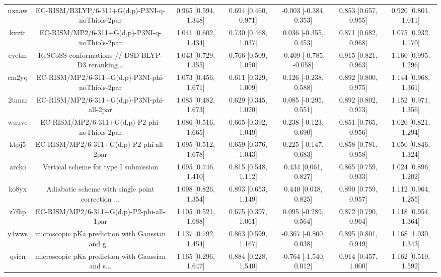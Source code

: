 \documentclass{article}
\begin{document}
\begin{center}
\begin{longtable}{|ccccccc|}
 nxaaw &    EC-RISM/B3LYP/6-311+G(d,p)-P3NI-q-noThiols-2par &  0.965 [0.594, 1.348] &  0.694 [0.460, 0.971] &   -0.003 [-0.384, 0.353] &  0.853 [0.657, 0.955] &   0.920 [0.801, 1.011] \\
 kxztt &      EC-RISM/MP2/6-311+G(d,p)-P3NI-q-noThiols-2par &  1.041 [0.602, 1.434] &  0.730 [0.468, 1.037] &    0.036 [-0.355, 0.453] &  0.871 [0.682, 0.968] &   1.075 [0.932, 1.170] \\
 eyetm &  ReSCoSS conformations // DSD-BLYP-D3 reranking... &  1.043 [0.729, 1.355] &  0.766 [0.509, 1.050] &  -0.409 [-0.785, -0.058] &  0.915 [0.821, 0.963] &   1.160 [0.995, 1.296] \\
 cm2yq &    EC-RISM/MP2/6-311+G(d,p)-P3NI-phi-noThiols-2par &  1.073 [0.456, 1.671] &  0.611 [0.329, 1.009] &    0.126 [-0.238, 0.588] &  0.892 [0.800, 0.975] &   1.144 [0.968, 1.361] \\
 2umai &         EC-RISM/MP2/6-311+G(d,p)-P3NI-phi-all-2par &  1.085 [0.482, 1.673] &  0.629 [0.345, 1.020] &    0.085 [-0.295, 0.551] &  0.892 [0.802, 0.973] &   1.152 [0.971, 1.356] \\
 wuuvc &      EC-RISM/MP2/6-311+G(d,p)-P2-phi-noThiols-2par &  1.086 [0.516, 1.665] &  0.665 [0.392, 1.049] &    0.238 [-0.123, 0.690] &  0.851 [0.765, 0.956] &   1.020 [0.821, 1.294] \\
 ktpj5 &           EC-RISM/MP2/6-311+G(d,p)-P2-phi-all-2par &  1.095 [0.512, 1.678] &  0.659 [0.376, 1.043] &    0.225 [-0.147, 0.683] &  0.858 [0.781, 0.958] &   1.050 [0.846, 1.324] \\
 arcko &              Vertical scheme for type I submission &  1.095 [0.746, 1.410] &  0.815 [0.548, 1.112] &     0.434 [0.061, 0.827] &  0.865 [0.759, 0.933] &   1.024 [0.896, 1.202] \\
 ko8yx &  Adiabatic scheme with single point correction ... &  1.098 [0.826, 1.354] &  0.893 [0.653, 1.149] &     0.440 [0.048, 0.825] &  0.890 [0.759, 0.957] &   1.112 [0.964, 1.255] \\
 z7fhp &           EC-RISM/MP2/6-311+G(d,p)-P2-phi-all-1par &  1.105 [0.521, 1.688] &  0.675 [0.397, 1.061] &    0.095 [-0.289, 0.564] &  0.872 [0.790, 0.964] &   1.118 [0.954, 1.364] \\
 y4wws &  microscopic pKa prediction with Gaussian and g... &  1.137 [0.792, 1.454] &  0.863 [0.599, 1.167] &   -0.367 [-0.800, 0.038] &  0.895 [0.801, 0.949] &   1.168 [1.030, 1.343] \\
 qsicn &  microscopic pKa prediction with Gaussian and s... &  1.165 [0.296, 1.647] &  0.884 [0.228, 1.540] &   -0.764 [-1.540, 0.012] &  0.914 [0.457, 1.000] &   1.162 [0.519, 1.592] \\

\end{longtable}
\end{center}
\end{document}
